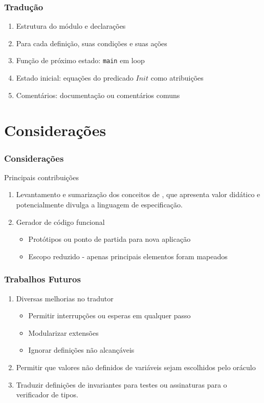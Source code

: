 \documentclass{beamer}
\begin{document}
\begin{frame}
  \frametitle{Tradução}

  \begin{enumerate}
    \item Estrutura do módulo e declarações

    \item Para cada definição, suas condições e suas ações

    \item Função de próximo estado: \texttt{main} em loop

    \item Estado inicial: equações do predicado $Init$ como atribuições

    \item Comentários: documentação ou comentários comuns

  \end{enumerate}
\end{frame}

\section{Considerações}

\begin{frame}
  \frametitle{Considerações}

  Principais contribuições
  \begin{enumerate}
    \item Levantamento e sumarização dos conceitos de \TLAA, que apresenta valor
      didático e potencialmente divulga a linguagem de especificação.
    \item Gerador de código funcional
      \begin{itemize}
        \item Protótipos ou ponto de partida para nova aplicação
        \item Escopo reduzido - apenas principais elementos foram mapeados
      \end{itemize}
  \end{enumerate}

\end{frame}

\begin{frame}
  \frametitle{Trabalhos Futuros}
  \begin{enumerate}
    \item Diversas melhorias no tradutor
    \begin{itemize}
        \item Permitir interrupções ou esperas em qualquer passo
        \item Modularizar extensões
        \item Ignorar definições não alcançáveis
        \end{itemize}
    \item Permitir que valores não definidos de variáveis sejam escolhidos
      pelo oráculo
    \item Traduzir definições de invariantes para testes ou assinaturas para o
      verificador de tipos.
  \end{enumerate}
\end{frame}
\end{document}
